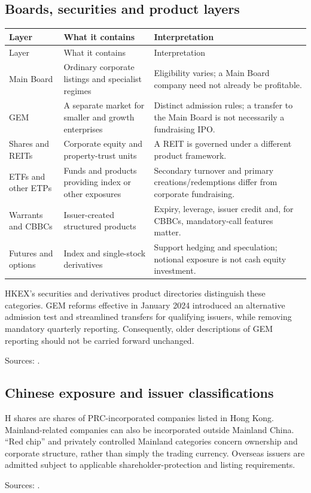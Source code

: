 \documentclass[11pt,a4paper]{article}
\newcommand{\source}[1]{\par{\footnotesize\color{ink}Sources: \cite{#1}.}\par}
\begin{document}
\subsection{Boards, securities and product layers}
\begin{longtable}{@{}L{3.0cm}L{5.3cm}L{7.2cm}@{}}
\toprule Layer & What it contains & Interpretation\\\midrule\endfirsthead
\toprule Layer & What it contains & Interpretation\\\midrule\endhead
Main Board & Ordinary corporate listings and specialist regimes & Eligibility varies; a Main Board company need not already be profitable.\\
GEM & A separate market for smaller and growth enterprises & Distinct admission rules; a transfer to the Main Board is not necessarily a fundraising IPO.\\
Shares and REITs & Corporate equity and property-trust units & A REIT is governed under a different product framework.\\
ETFs and other ETPs & Funds and products providing index or other exposures & Secondary turnover and primary creations/redemptions differ from corporate fundraising.\\
Warrants and CBBCs & Issuer-created structured products & Expiry, leverage, issuer credit and, for CBBCs, mandatory-call features matter.\\
Futures and options & Index and single-stock derivatives & Support hedging and speculation; notional exposure is not cash equity investment.\\
\bottomrule
\end{longtable}
HKEX's securities and derivatives product directories distinguish these categories. GEM reforms effective in January 2024 introduced an alternative admission test and streamlined transfers for qualifying issuers, while removing mandatory quarterly reporting. Consequently, older descriptions of GEM reporting should not be carried forward unchanged.\source{hkproducts,gem}

\subsection{Chinese exposure and issuer classifications}
H shares are shares of PRC-incorporated companies listed in Hong Kong. Mainland-related companies can also be incorporated outside Mainland China. ``Red chip'' and privately controlled Mainland categories concern ownership and corporate structure, rather than simply the trading currency. Overseas issuers are admitted subject to applicable shareholder-protection and listing requirements.\source{overseas}
\end{document}
